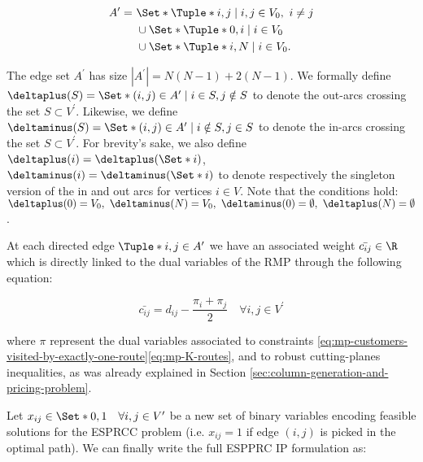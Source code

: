 \begin{equation}
	\begin{aligned}
		A^\prime = \  & \Set*{\Tuple*{i, j} \mid i, j \in V_0,\ i \ne j} \\
		              & \cup \Set*{\Tuple*{0, i} \mid i \in V_0}         \\
		              & \cup \Set*{\Tuple*{i, N} \mid i \in V_0}.
	\end{aligned}
\end{equation}

The edge set $A^\prime$ has size $|A^\prime| = N(N - 1) + 2(N - 1)$.
We formally define $\deltaplus(S) = \Set*{(i, j) \in A^\prime \mid i \in S, j \notin S}$
to denote the out-arcs crossing the set $S \subset V^\prime$.
Likewise, we define $\deltaminus(S) = \Set*{(i, j) \in A^\prime \mid i \notin S, j \in S}$
to denote the in-arcs crossing the set $S \subset V^\prime$.
For brevity’s sake,
we also define $\deltaplus(i) = \deltaplus(\Set*{i})$, $\deltaminus(i) = \deltaminus(\Set*{i})$
to denote respectively the singleton version of the in and out arcs for vertices $i \in V$.
Note that the conditions hold:
$\deltaplus(0) = V_0,\ \deltaminus(N) = V_0,\ \deltaminus(0) = \emptyset,\ \deltaplus(N) = \emptyset$.

At each directed edge $\Tuple*{i, j} \in A^\prime$ we have an associated weight $\bar{c_{ij}} \in \R$ which is directly linked to the dual variables of the RMP through the following equation:

\begin{equation}
	\bar{c_{ij}} = d_{ij} - \frac{\pi_i + \pi_j}{2} \quad \forall i, j \in V^\prime
\end{equation}

where $\pi$ represent the dual variables associated to constraints \eqref{eq:mp-customers-visited-by-exactly-one-route}\eqref{eq:mp-K-routes},
and to robust cutting-planes inequalities,
as was already explained in Section \ref{sec:column-generation-and-pricing-problem}.

Let $x_{ij} \in \Set*{0, 1} \quad \forall i, j \in V^\prime$ be a new set of binary variables
encoding feasible solutions for the ESPRCC problem (i.e. $x_{ij} = 1$ if edge $(i, j)$ is picked in the optimal path).
We can finally write the full ESPPRC IP formulation as:

